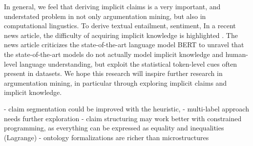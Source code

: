 
In general, we feel that deriving implicit claims is a very important, and
understated problem in not only argumentation mining, but also in computational
lingustics. To derive textual entailment, sentiment, In a recent news article,
the difficulty of acquiring implicit knowledge is highlighted
\citep{gradientpub}.  The news article criticizes the state-of-the-art language
model BERT \citep{devlin2018bert} to unravel that the state-of-the-art models
do not actually model implicit knowledge and human-level language
understanding, but exploit the statistical token-level cues often present in
datasets. We hope this research will inspire further research in argumentation
mining, in particular through exploring implicit claims and implicit knowledge. 


- claim segmentation could be improved with the heuristic, 
- multi-label approach needs further exploration 
- claim structuring may work better with constrained programming, 
as everything can be expressed as equality and inequalities (Lagrange)
- ontology formalizations are richer than microstructures
